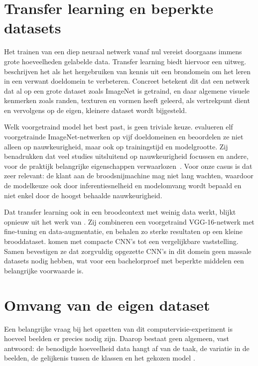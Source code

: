 \section{Transfer learning en beperkte datasets}


Het trainen van een diep neuraal netwerk vanaf nul vereist doorgaans immens grote
hoeveelheden gelabelde data. Transfer learning biedt hiervoor een uitweg.
\textcite{Zhuang2021} beschrijven het als het hergebruiken van kennis uit een
brondomein om het leren in een verwant doeldomein te verbeteren. Concreet betekent dit
dat een netwerk dat al op een grote dataset zoals ImageNet is getraind, en daar
algemene visuele kenmerken zoals randen, texturen en vormen heeft geleerd, als
vertrekpunt dient en vervolgens op de eigen, kleinere dataset wordt bijgesteld.


Welk voorgetraind model het best past, is geen triviale keuze. \textcite{AbouBaker2022}
evalueren elf voorgetrainde ImageNet-netwerken op vijf doeldomeinen en beoordelen ze
niet alleen op nauwkeurigheid, maar ook op trainingstijd en modelgrootte. Zij
benadrukken dat veel studies uitsluitend op nauwkeurigheid focussen en andere, voor de
praktijk belangrijke eigenschappen verwaarlozen~\autocite{AbouBaker2022}. Voor onze
casus is dat zeer relevant: de klant aan de broodsnijmachine mag niet lang
wachten, waardoor de modelkeuze ook door inferentiesnelheid en modelomvang wordt
bepaald en niet enkel door de hoogst behaalde nauwkeurigheid.


Dat transfer learning ook in een broodcontext met weinig data werkt, blijkt opnieuw uit
het werk van \textcite{Tantiphanwadi2022}. Zij combineren een voorgetraind
VGG-16-netwerk met fine-tuning en data-augmentatie, en behalen zo sterke resultaten op
een kleine brooddataset. \textcite{Cotrim2020} komen met compacte CNN's tot een
vergelijkbare vaststelling. Samen bevestigen ze dat zorgvuldig opgezette CNN's in
dit domein geen massale datasets nodig hebben, wat voor een bachelorproef met beperkte
middelen een belangrijke voorwaarde is.


\section{Omvang van de eigen dataset}


Een belangrijke vraag bij het opzetten van dit computervisie-experiment is hoeveel
beelden er precies nodig zijn. Daarop bestaat geen algemeen, vast antwoord: de
benodigde hoeveelheid data hangt af van de taak, de variatie in de beelden, de
gelijkenis tussen de klassen en het gekozen model \autocite{Shorten2019}.


